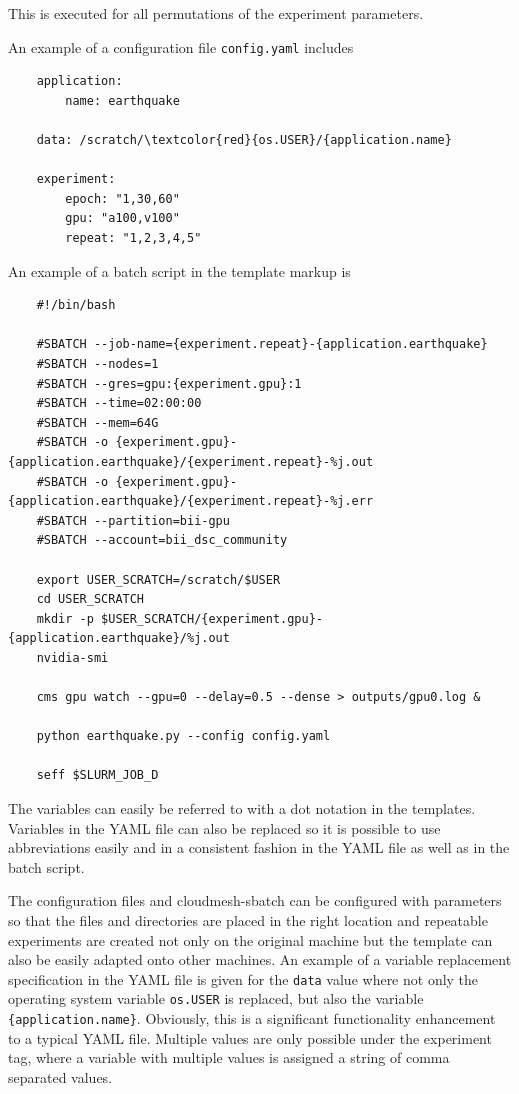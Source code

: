 \documentclass[utf8]{FrontiersinVancouver} %
\begin{document}
This is executed for all permutations of the experiment parameters.

An example of a configuration file \verb|config.yaml| includes

{\footnotesize
\begin{Verbatim}
    application:
        name: earthquake

    data: /scratch/\textcolor{red}{os.USER}/{application.name}
       
    experiment:
        epoch: "1,30,60"
        gpu: "a100,v100"
        repeat: "1,2,3,4,5"
\end{Verbatim}
}

An example of a batch script in the template markup is

{\footnotesize
\begin{Verbatim}
    #!/bin/bash

    #SBATCH --job-name={experiment.repeat}-{application.earthquake}
    #SBATCH --nodes=1
    #SBATCH --gres=gpu:{experiment.gpu}:1
    #SBATCH --time=02:00:00
    #SBATCH --mem=64G
    #SBATCH -o {experiment.gpu}-{application.earthquake}/{experiment.repeat}-%j.out
    #SBATCH -o {experiment.gpu}-{application.earthquake}/{experiment.repeat}-%j.err
    #SBATCH --partition=bii-gpu
    #SBATCH --account=bii_dsc_community

    export USER_SCRATCH=/scratch/$USER
    cd USER_SCRATCH
    mkdir -p $USER_SCRATCH/{experiment.gpu}-{application.earthquake}/%j.out
    nvidia-smi

    cms gpu watch --gpu=0 --delay=0.5 --dense > outputs/gpu0.log &

    python earthquake.py --config config.yaml

    seff $SLURM_JOB_D
\end{Verbatim}
}

The variables can easily be referred to with a dot notation in the
templates.  Variables in the YAML file can also be replaced so it is
possible to use abbreviations easily and in a consistent fashion in
the YAML file as well as in the batch script.

The configuration files and cloudmesh-sbatch can be configured with
parameters so that the files and directories are placed in the right
location and repeatable experiments are created not only on the
original machine but the template can also be easily adapted onto
other machines. An example of a variable replacement specification in the 
YAML file is given for the \verb|data| value where not only the
operating system variable \verb|os.USER| is replaced, but also the
variable \verb|{application.name}|. Obviously, this is a significant
functionality enhancement to a typical YAML file.  Multiple values are
only possible under the experiment tag, where a variable with multiple
values is assigned a string  of comma separated values.
\end{document}
